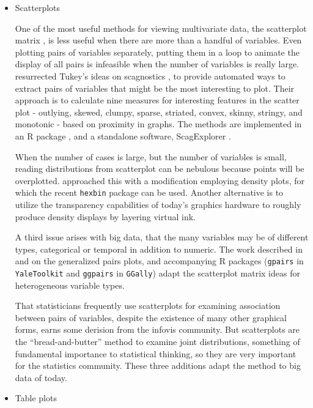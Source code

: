 \documentclass{article}
\begin{document}
\begin{itemize}
\item Scatterplots

One of the most useful methods for viewing multivariate data, the scatterplot matrix \citep{scatmat}, is less useful when there are more than a handful of variables. Even plotting pairs of variables separately, putting them in a loop to animate the display of all pairs is infeasible when the number of variables is really large.  \citet{wilkinson2005graph} resurrected Tukey's ideas on scagnostics \citep{TukeyTukey1985}, to provide automated ways to extract pairs of variables that might be the most interesting to plot. Their approach is to calculate nine measures for interesting features in the scatter plot - outlying, skewed, clumpy, sparse, striated, convex, skinny, stringy, and monotonic - based on proximity in graphs. The methods are implemented in an R package \citet{wilkinson2014package}, and a standalone software, ScagExplorer \citep{dang2014scagexplorer}.

When the number of cases is large, but the number of variables is small, reading distributions from scatterplot can be nebulous because points will be overplotted. \citet{carr-scatmat} approached this with a modification employing density plots, for which the recent {\tt hexbin} \citep{carr2010hexbin} package can be used. Another alternative is to utilize the transparency capabilities of today's graphics hardware to roughly produce density displays by layering virtual ink.

A third issue arises with big data, that the many variables may be of different types, categorical or temporal in addition to numeric. The work described in \citet{emerson2013generalized} and \citet{friendly2014comment} on the generalized pairs plots, and accompanying R packages ({\tt gpairs} in {\tt YaleToolkit} and {\tt ggpairs} in {\tt GGally}) adapt the scatterplot matrix ideas for heterogeneous variable types.

That statisticians frequently use scatterplots for examining association between pairs of variables, despite the existence of many other graphical forms, earns some derision from the infovis community. But scatterplots are the ``bread-and-butter'' method to examine joint distributions, something of fundamental importance to statistical thinking, so they are very important for the statistics community. These three additions adapt the method to big data of today.

\item Table plots


\end{itemize}
\end{document}
